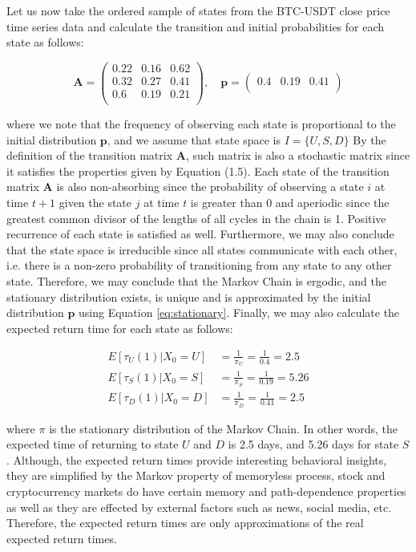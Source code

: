 Let us now take the ordered sample of states from the BTC-USDT close price time series data and calculate 
the transition and initial probabilities for each state as follows:

\begin{equation}
    \textbf{A} = \begin{pmatrix}
     0.22 & 0.16 & 0.62 \\
     0.32 & 0.27 & 0.41 \\
     0.6 & 0.19 & 0.21 \\
     \end{pmatrix}
     , \quad 
     \textbf{p} = \begin{pmatrix}
     0.4 & 0.19 & 0.41 \\
     \end{pmatrix}
 \end{equation}

where we note that the frequency of observing each state is proportional to the initial distribution $\textbf{p}$, and we assume that state space is $I = \{U,S,D\}$ 
By the definition of the transition matrix $\textbf{A}$, such matrix is also a stochastic matrix since it satisfies the properties given by Equation (1.5).
Each state of the transition matrix $\textbf{A}$ is also non-absorbing since the probability of observing a state $i$ at time $t+1$ given the state $j$ at time $t$ is greater than 0 
and aperiodic since the greatest common divisor of the lengths of all cycles in the chain is 1. Positive recurrence of each state is satisfied as well.
Furthermore, we may also conclude that the state space is irreducible since all states communicate with each other, i.e. there is a non-zero probability of transitioning from any state to any other state.
Therefore, we may conclude that the Markov Chain is ergodic, and the stationary distribution exists, is unique and is approximated by the initial distribution $\textbf{p}$ using Equation \ref{eq:stationary}.
Finally, we may also calculate the expected return time for each state as follows:

\begin{align}
    E[\tau_U(1)|X_0=U] &= \frac{1}{\pi_U} = \frac{1}{0.4} = 2.5 \\
    E[\tau_S(1)|X_0=S] &= \frac{1}{\pi_S} = \frac{1}{0.19} = 5.26 \\
    E[\tau_D(1)|X_0=D] &= \frac{1}{\pi_D} = \frac{1}{0.41} = 2.5
\end{align}

where $\pi$ is the stationary distribution of the Markov Chain. In other words, the expected time of returning to 
state $U$ and $D$ is 2.5 days, and 5.26 days for state $S$. Although, the expected return times provide interesting behavioral insights,
they are simplified by the Markov property of memoryless process, stock and cryptocurrency markets do have certain memory and path-dependence properties as well as they 
are effected by external factors such as news, social media, etc. Therefore, the expected return times are only approximations of the real expected return times.

